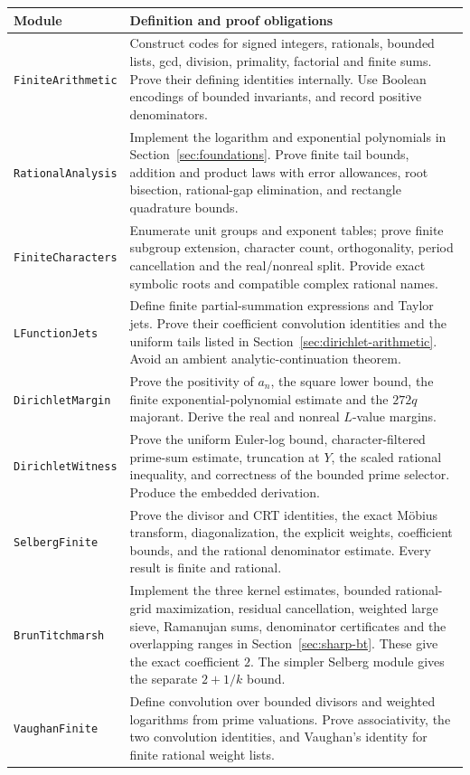 \begin{longtable}{@{}p{38mm}p{107mm}@{}}
\toprule
Module & Definition and proof obligations \\
\midrule
\endhead
\texttt{FiniteArithmetic} & Construct codes for signed integers, rationals, bounded lists, gcd, division, primality, factorial and finite sums. Prove their defining identities internally. Use Boolean encodings of bounded invariants, and record positive denominators. \\
\texttt{RationalAnalysis} & Implement the logarithm and exponential polynomials in Section~\ref{sec:foundations}. Prove finite tail bounds, addition and product laws with error allowances, root bisection, rational-gap elimination, and rectangle quadrature bounds. \\
\texttt{FiniteCharacters} & Enumerate unit groups and exponent tables; prove finite subgroup extension, character count, orthogonality, period cancellation and the real/nonreal split. Provide exact symbolic roots and compatible complex rational names. \\
\texttt{LFunctionJets} & Define finite partial-summation expressions and Taylor jets. Prove their coefficient convolution identities and the uniform tails listed in Section~\ref{sec:dirichlet-arithmetic}. Avoid an ambient analytic-continuation theorem. \\
\texttt{DirichletMargin} & Prove the positivity of $a_n$, the square lower bound, the finite exponential-polynomial estimate and the $272q$ majorant. Derive the real and nonreal $L$-value margins. \\
\texttt{DirichletWitness} & Prove the uniform Euler-log bound, character-filtered prime-sum estimate, truncation at $Y$, the scaled rational inequality, and correctness of the bounded prime selector. Produce the embedded derivation. \\
\texttt{SelbergFinite} & Prove the divisor and CRT identities, the exact M\"obius transform, diagonalization, the explicit weights, coefficient bounds, and the rational denominator estimate. Every result is finite and rational. \\
\texttt{BrunTitchmarsh} & Implement the three kernel estimates, bounded rational-grid maximization, residual cancellation, weighted large sieve, Ramanujan sums, denominator certificates and the overlapping ranges in Section~\ref{sec:sharp-bt}. These give the exact coefficient $2$. The simpler Selberg module gives the separate $2+1/k$ bound. \\
\texttt{VaughanFinite} & Define convolution over bounded divisors and weighted logarithms from prime valuations. Prove associativity, the two convolution identities, and Vaughan's identity for finite rational weight lists. \\

\end{longtable}
